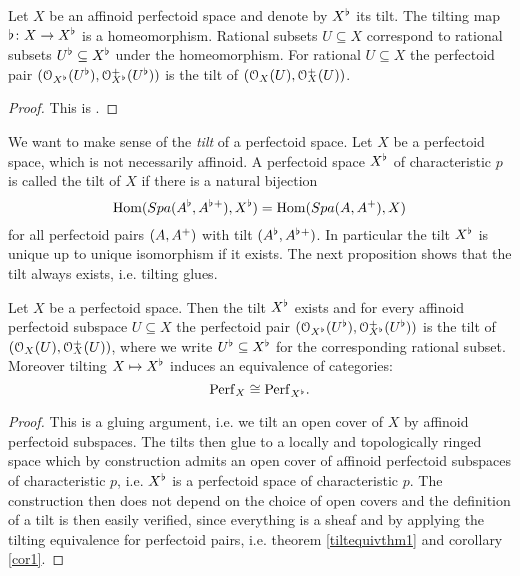 \begin{prop}
Let $X$ be an affinoid perfectoid space and denote by $X^{\flat}$ its tilt.
The tilting map $\flat\colon X\to X^{\flat}$ is a homeomorphism.
Rational subsets $U\subseteq X$ correspond to rational subsets $U^{\flat}\subseteq X^{\flat}$ under the homeomorphism. For rational $U\subseteq X$
the perfectoid pair
$(\mathcal{O}_{X^{\flat}}(U^{\flat}),\mathcal{O}{^{+}}\!\!\!\!_{X^{\flat}}(U^{\flat}))$ is the tilt of 
$(\mathcal{O}_{X}(U),\mathcal{O}{^{+}}\!\!\!\!_X(U))$.
\end{prop}
\begin{proof}
This is \cite[theorem 6.3]{Scholze12}.
\end{proof}


We want to make sense of the \emph{tilt} of a perfectoid space. Let $X$ be a perfectoid space, which is not necessarily affinoid.
A perfectoid space $X^{\flat}$ of characteristic $p$  is called the tilt of $X$ if there is a natural bijection
\[{\rm{Hom}}({Spa({A^{\flat}},{A^{\flat}{^{+}}})},X^{\flat})={\rm{Hom}}({Spa({A},{A{^{+}}})},X)\]
for all perfectoid pairs $(A,A{^{+}})$ with tilt $(A^{\flat},A^{\flat}{^{+}})$.
In particular the tilt $X^{\flat}$ is unique up to unique isomorphism if it exists. The next proposition shows that the tilt always exists, i.e. tilting glues.

\begin{prop}
Let $X$ be a perfectoid space. Then the tilt $X^{\flat}$ exists and for every affinoid perfectoid subspace $U\subseteq X$
the perfectoid pair
$(\mathcal{O}_{X^{\flat}}(U^{\flat}),\mathcal{O}{^{+}}\!\!\!\!_{X^{\flat}}(U^{\flat}))$ is the tilt of 
$(\mathcal{O}_{X}(U),\mathcal{O}{^{+}}\!\!\!\!_X(U))$,
where we write $U^{\flat}\subseteq X^{\flat}$ for the corresponding rational subset.
Moreover tilting $X\mapsto X^{\flat}$ induces an equivalence of categories:
\[\mathrm{Perf}_{X}\cong\mathrm{Perf}_{X^{\flat}}.\]
\end{prop}
\begin{proof}
This is a gluing argument, i.e. we tilt an open cover of $X$ by affinoid perfectoid subspaces. The tilts then glue to a locally and topologically ringed space which by construction admits an open cover of affinoid perfectoid subspaces of characteristic $p$, i.e. $X^{\flat}$ is a perfectoid space of characteristic $p$. The construction then does not depend on the choice of open covers and the definition of a tilt is then easily verified, since everything is a sheaf and by applying the tilting equivalence for perfectoid pairs, i.e. theorem \ref{tiltequivthm1} and corollary \ref{cor1}.
\end{proof}


